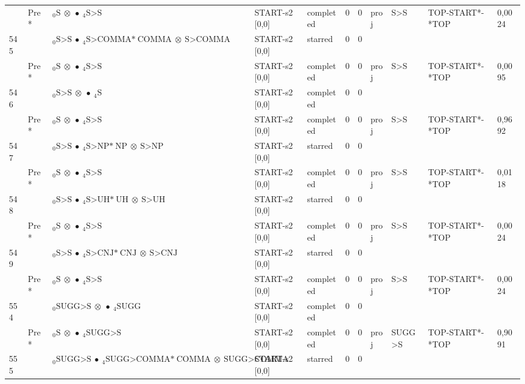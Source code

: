 \documentclass[10pt]{article}
\begin{document}
\begin{longtable}[htbp]{lllllllllll}
 & Pre *& $ {}_0 \textrm{S} \  \otimes \  \bullet \ {}_{4} \textrm{S>S} $ & START-s2 [0,0] & completed & 0 & 0 & proj & S>S & TOP-START*-*TOP & 0,0024 \\ 
545 & & $ {}_0 \textrm{S>S} \  \bullet \ {}_{4} \textrm{S>COMMA*} \ \textrm{COMMA} \  \otimes \ \textrm{S>COMMA} $ & START-s2 [0,0] & starred & 0 & 0 & & & & \\ 
 & Pre *& $ {}_0 \textrm{S} \  \otimes \  \bullet \ {}_{4} \textrm{S>S} $ & START-s2 [0,0] & completed & 0 & 0 & proj & S>S & TOP-START*-*TOP & 0,0095 \\ 
546 & & $ {}_0 \textrm{S>S} \  \otimes \  \bullet \ {}_{4} \textrm{S} $ & START-s2 [0,0] & completed & 0 & 0 & & & & \\ 
 & Pre *& $ {}_0 \textrm{S} \  \otimes \  \bullet \ {}_{4} \textrm{S>S} $ & START-s2 [0,0] & completed & 0 & 0 & proj & S>S & TOP-START*-*TOP & 0,9692 \\ 
547 & & $ {}_0 \textrm{S>S} \  \bullet \ {}_{4} \textrm{S>NP*} \ \textrm{NP} \  \otimes \ \textrm{S>NP} $ & START-s2 [0,0] & starred & 0 & 0 & & & & \\ 
 & Pre *& $ {}_0 \textrm{S} \  \otimes \  \bullet \ {}_{4} \textrm{S>S} $ & START-s2 [0,0] & completed & 0 & 0 & proj & S>S & TOP-START*-*TOP & 0,0118 \\ 
548 & & $ {}_0 \textrm{S>S} \  \bullet \ {}_{4} \textrm{S>UH*} \ \textrm{UH} \  \otimes \ \textrm{S>UH} $ & START-s2 [0,0] & starred & 0 & 0 & & & & \\ 
 & Pre *& $ {}_0 \textrm{S} \  \otimes \  \bullet \ {}_{4} \textrm{S>S} $ & START-s2 [0,0] & completed & 0 & 0 & proj & S>S & TOP-START*-*TOP & 0,0024 \\ 
549 & & $ {}_0 \textrm{S>S} \  \bullet \ {}_{4} \textrm{S>CNJ*} \ \textrm{CNJ} \  \otimes \ \textrm{S>CNJ} $ & START-s2 [0,0] & starred & 0 & 0 & & & & \\ 
 & Pre *& $ {}_0 \textrm{S} \  \otimes \  \bullet \ {}_{4} \textrm{S>S} $ & START-s2 [0,0] & completed & 0 & 0 & proj & S>S & TOP-START*-*TOP & 0,0024 \\ 
554 & & $ {}_0 \textrm{SUGG>S} \  \otimes \  \bullet \ {}_{4} \textrm{SUGG} $ & START-s2 [0,0] & completed & 0 & 0 & & & & \\ 
 & Pre *& $ {}_0 \textrm{S} \  \otimes \  \bullet \ {}_{4} \textrm{SUGG>S} $ & START-s2 [0,0] & completed & 0 & 0 & proj & SUGG>S & TOP-START*-*TOP & 0,9091 \\ 
555 & & $ {}_0 \textrm{SUGG>S} \  \bullet \ {}_{4} \textrm{SUGG>COMMA*} \ \textrm{COMMA} \  \otimes \ \textrm{SUGG>COMMA} $ & START-s2 [0,0] & starred & 0 & 0 & & & & \\ 

\end{longtable}
\end{document}
